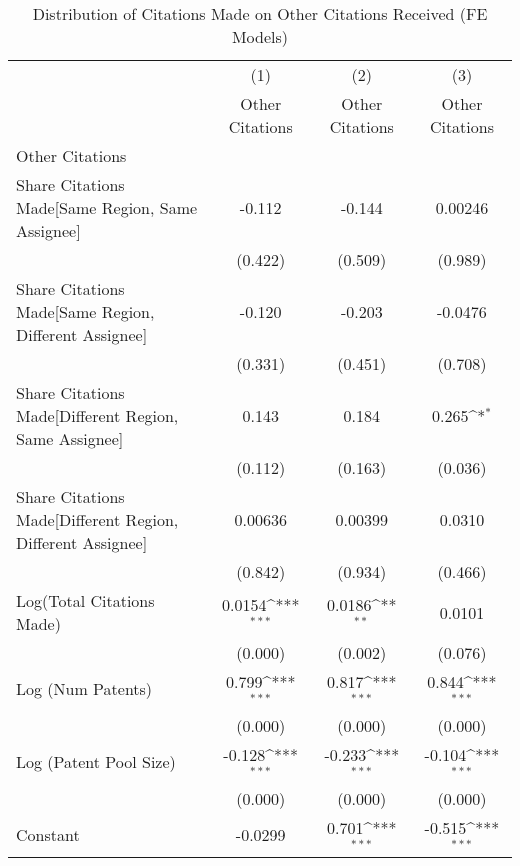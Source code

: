 {
\def\sym#1{\ifmmode^{#1}\else\(^{#1}\)\fi}
\begin{longtable}{l*{3}{c}}
\caption{Distribution of Citations Made on Other Citations Received (FE Models)  \label{model252627}}\\
\hline\hline\endfirsthead\hline\endhead\hline\endfoot\endlastfoot
                &\multicolumn{1}{c}{(1)}&\multicolumn{1}{c}{(2)}&\multicolumn{1}{c}{(3)}\\
                &\multicolumn{1}{c}{Other Citations}&\multicolumn{1}{c}{Other Citations}&\multicolumn{1}{c}{Other Citations}\\
\hline
Other Citations &                  &                  &                  \\
Share Citations Made[Same Region, Same Assignee]&   -0.112         &   -0.144         &  0.00246         \\
                &  (0.422)         &  (0.509)         &  (0.989)         \\
Share Citations Made[Same Region, Different Assignee]&   -0.120         &   -0.203         &  -0.0476         \\
                &  (0.331)         &  (0.451)         &  (0.708)         \\
Share Citations Made[Different Region, Same Assignee]&    0.143         &    0.184         &    0.265\sym{*}  \\
                &  (0.112)         &  (0.163)         &  (0.036)         \\
Share Citations Made[Different Region, Different Assignee]&  0.00636         &  0.00399         &   0.0310         \\
                &  (0.842)         &  (0.934)         &  (0.466)         \\
Log(Total Citations Made)&   0.0154\sym{***}&   0.0186\sym{**} &   0.0101         \\
                &  (0.000)         &  (0.002)         &  (0.076)         \\
Log (Num Patents)&    0.799\sym{***}&    0.817\sym{***}&    0.844\sym{***}\\
                &  (0.000)         &  (0.000)         &  (0.000)         \\
Log (Patent Pool Size)&   -0.128\sym{***}&   -0.233\sym{***}&   -0.104\sym{***}\\
                &  (0.000)         &  (0.000)         &  (0.000)         \\
Constant        &  -0.0299         &    0.701\sym{***}&   -0.515\sym{***}\\

\end{longtable}}
